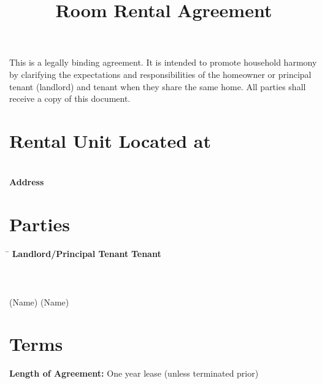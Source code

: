 \documentclass[12pt]{article}
\begin{document}
\title{\textbf{Room Rental Agreement}}
\date{}
\maketitle
\noindent This is a legally binding agreement. It is intended to promote household harmony by clarifying the expectations and responsibilities of the homeowner or principal tenant (landlord) and tenant when they share the same home. All parties shall receive a copy of this document.
\section*{Rental Unit Located at}
\vspace{24pt}
\noindent \underline{\hspace{4.5in}} \\
\textbf{Address}
\section*{Parties}
\begin{tabbing}
    \hspace{3.5in} \= \hspace{1.5in} \kill
    \textbf{Landlord/Principal Tenant} \> \textbf{Tenant} \\
    \vspace{1pt} \\
    \vspace{1pt} \\
    \underline{\hspace{2in}} \> \underline{\hspace{2in}} \\
    (Name) \> (Name)
\end{tabbing}
\section*{Terms}
\noindent \textbf{Length of Agreement:} One year lease (unless terminated prior)
\end{document}
